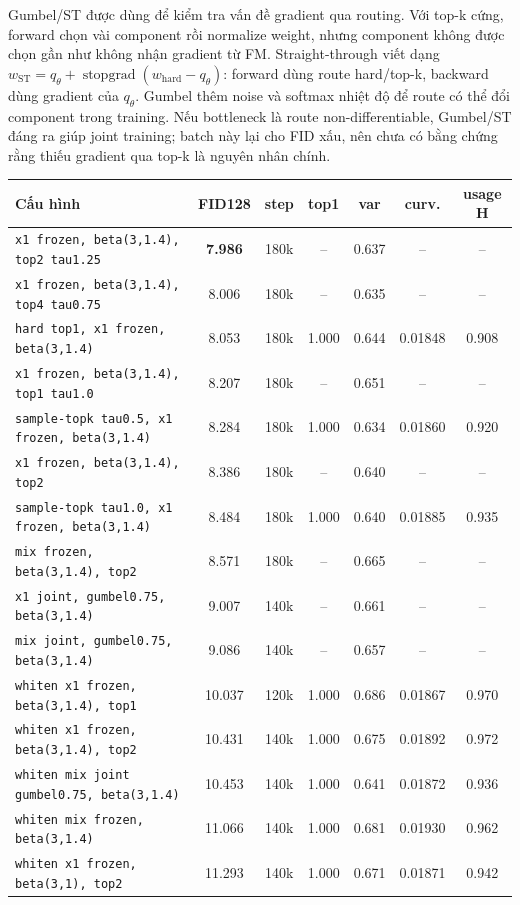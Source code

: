 \documentclass[11pt,a4paper]{article}
\newcommand{\stopgrad}{\operatorname{stopgrad}}
\newcommand{\run}[1]{{\small\nolinkurl{#1}}}
\newcommand{\best}[1]{\textbf{#1}}
\newcommand{\na}{--}
\begin{document}
Gumbel/ST được dùng để kiểm tra vấn đề gradient qua routing. Với top-k cứng, forward chọn vài component rồi normalize weight, nhưng component không được chọn gần như không nhận gradient từ FM. Straight-through viết dạng \(w_{\mathrm{ST}}=q_\theta+\stopgrad(w_{\mathrm{hard}}-q_\theta)\): forward dùng route hard/top-k, backward dùng gradient của \(q_\theta\). Gumbel thêm noise và softmax nhiệt độ để route có thể đổi component trong training. Nếu bottleneck là route non-differentiable, Gumbel/ST đáng ra giúp joint training; batch này lại cho FID xấu, nên chưa có bằng chứng rằng thiếu gradient qua top-k là nguyên nhân chính.

\begin{center}
\small
\setlength{\tabcolsep}{3pt}
\begin{tabularx}{\linewidth}{@{}Y c c c c c c@{}}
\toprule
\textbf{Cấu hình} & \textbf{FID128} & \textbf{step} & \textbf{top1} & \textbf{var} & \textbf{curv.} & \textbf{usage H}\\
\midrule
\run{x1 frozen, beta(3,1.4), top2 tau1.25} & \best{7.986} & 180k & \na{} & 0.637 & \na{} & \na{}\\
\run{x1 frozen, beta(3,1.4), top4 tau0.75} & 8.006 & 180k & \na{} & 0.635 & \na{} & \na{}\\
\run{hard top1, x1 frozen, beta(3,1.4)} & 8.053 & 180k & 1.000 & 0.644 & 0.01848 & 0.908\\
\run{x1 frozen, beta(3,1.4), top1 tau1.0} & 8.207 & 180k & \na{} & 0.651 & \na{} & \na{}\\
\run{sample-topk tau0.5, x1 frozen, beta(3,1.4)} & 8.284 & 180k & 1.000 & 0.634 & 0.01860 & 0.920\\
\run{x1 frozen, beta(3,1.4), top2} & 8.386 & 180k & \na{} & 0.640 & \na{} & \na{}\\
\run{sample-topk tau1.0, x1 frozen, beta(3,1.4)} & 8.484 & 180k & 1.000 & 0.640 & 0.01885 & 0.935\\
\run{mix frozen, beta(3,1.4), top2} & 8.571 & 180k & \na{} & 0.665 & \na{} & \na{}\\
\run{x1 joint, gumbel0.75, beta(3,1.4)} & 9.007 & 140k & \na{} & 0.661 & \na{} & \na{}\\
\run{mix joint, gumbel0.75, beta(3,1.4)} & 9.086 & 140k & \na{} & 0.657 & \na{} & \na{}\\
\run{whiten x1 frozen, beta(3,1.4), top1} & 10.037 & 120k & 1.000 & 0.686 & 0.01867 & 0.970\\
\run{whiten x1 frozen, beta(3,1.4), top2} & 10.431 & 140k & 1.000 & 0.675 & 0.01892 & 0.972\\
\run{whiten mix joint gumbel0.75, beta(3,1.4)} & 10.453 & 140k & 1.000 & 0.641 & 0.01872 & 0.936\\
\run{whiten mix frozen, beta(3,1.4)} & 11.066 & 140k & 1.000 & 0.681 & 0.01930 & 0.962\\
\run{whiten x1 frozen, beta(3,1), top2} & 11.293 & 140k & 1.000 & 0.671 & 0.01871 & 0.942\\
\bottomrule
\end{tabularx}
\end{center}
\end{document}
